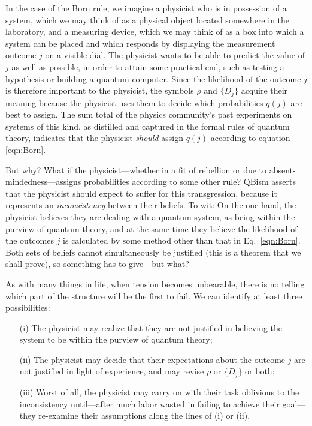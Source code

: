 \documentclass[%
 reprint,superscriptaddress,
 amsmath,amssymb,
 aps,pra, onecolumn, 12pt
]{revtex4-2}
\newcommand{\tit}[1]{\textit{#1}}
\begin{document}
In the case of the Born rule, we imagine a physicist who is in possession of a system, which we may think of as a physical object located somewhere in the laboratory, and a measuring device, which we may think of as a box into which a system can be placed and which responds by displaying the measurement outcome $j$ on a visible dial. The physicist wants to be able to predict the value of $j$ as well as possible, in order to attain some practical end, such as testing a hypothesis or building a quantum computer. Since the likelihood of the outcome $j$ is therefore important to the physicist, the symbols $\rho$ and $\{ D_j \}$ acquire their meaning because the physicist uses them to decide which probabilities $q(j)$ are best to assign. The sum total of the physics community's past experiments on systems of this kind, as distilled and captured in the formal rules of quantum theory, indicates that the physicist \tit{should} assign $q(j)$ according to equation \eqref{eqn:Born}.

But why? What if the physicist---whether in a fit of rebellion or due to absent-mindedness---assigns probabilities according to some other rule?  QBism asserts that the physicist should expect to suffer for this transgression, because it represents an \tit{inconsistency} between their beliefs. To wit: On the one hand, the physicist believes they are dealing with a quantum system, as being within the purview of quantum theory, and at the same time they believe the likelihood of the outcomes $j$ is calculated by some method other than that in Eq.\ \eqref{eqn:Born}. Both sets of beliefs cannot simultaneously be justified (this is a theorem that we shall prove), so something has to give---but what?

As with many things in life, when tension becomes unbearable, there is no telling which part of the structure will be the first to fail. We can identify at least three possibilities:
\begin{itemize}
\item[(i)]
The physicist may realize that they are not justified in believing the system to be within the purview of quantum theory;
\item[(ii)]
The physicist may decide that their expectations about the outcome $j$ are not justified in light of experience, and may revise $\rho$ or $\{ D_j \}$ or both;
\item[(iii)]
Worst of all, the physicist may carry on with their task oblivious to the inconsistency until---after much labor wasted in failing to achieve their goal---they re-examine their assumptions along the lines of (i) or (ii).
\end{itemize}
\end{document}

